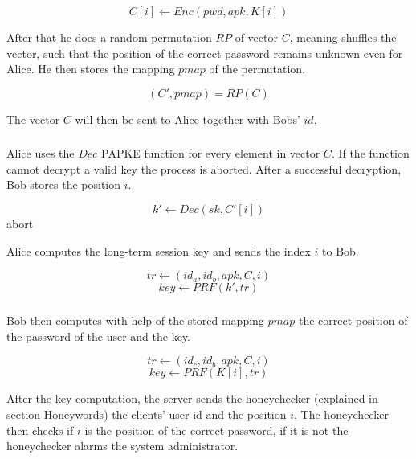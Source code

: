 \documentclass[../main.tex]{subfiles}
\begin{document}
\begin{algorithmic}
	\[C[i] \leftarrow Enc(pwd, apk, K[i])\]
  \EndFor
\end{algorithmic}

After that he does a random permutation \(RP\) of vector \(C\), meaning shuffles the
vector, such that the position of the correct password remains unknown even for
Alice. He then stores the mapping \(pmap\) of the permutation.

\[(C', pmap) = RP(C)\]

The vector \(C\) will then be sent to Alice together with Bobs' \(id\).

\subsubsection{} Alice uses the \(Dec\) PAPKE function for every element in
vector \(C\). If the function cannot decrypt a valid key the process is 
aborted. After a successful decryption, Bob stores the position \(i\). 

\begin{algorithmic}
	\[k' \leftarrow Dec(sk, C'[i])\]
  \EndFor
    abort
  \EndIf
\end{algorithmic}

Alice computes the long-term session key and sends the index \(i\) to Bob. 

\[tr \leftarrow (id_a, id_b, apk, C, i)\]
\[key \leftarrow PRF(k', tr)\]

\subsubsection{} Bob then computes with help of the stored mapping \(pmap\) the
correct position of the password of the user and the key. 

\[tr \leftarrow (id_c, id_b, apk, C, i)\]
\[key \leftarrow PRF(K[i], tr)\]

After the key computation, the server sends the honeychecker (explained in section
Honeywords) the clients' user id and the position \(i\). The honeychecker then
checks if \(i\) is the position of the correct password, if it is not the
honeychecker alarms the system administrator.
\end{document}
